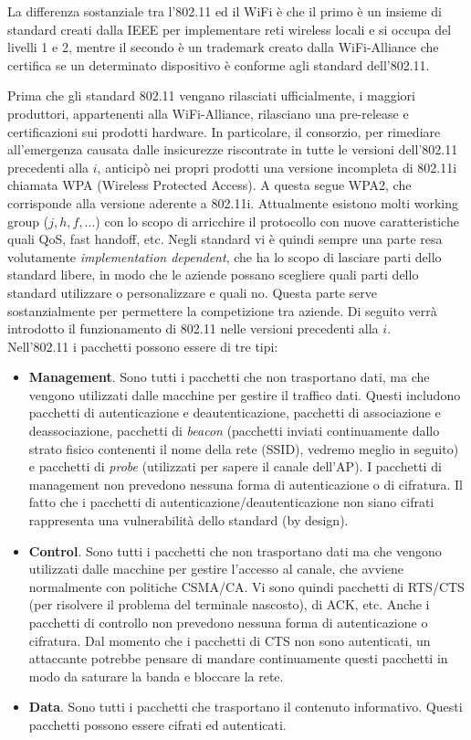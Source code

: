 La differenza sostanziale tra l'802.11 ed il WiFi è che il primo è un insieme di standard creati dalla IEEE per implementare reti wireless locali e si occupa del livelli 1 e 2, mentre il secondo è un trademark creato dalla WiFi-Alliance che certifica se un determinato dispositivo è conforme agli standard dell'802.11.

Prima che gli standard 802.11 vengano rilasciati ufficialmente, i maggiori produttori, appartenenti  alla WiFi-Alliance, rilasciano una pre-release e certificazioni sui prodotti hardware. In particolare, il consorzio, per rimediare all'emergenza causata dalle insicurezze riscontrate in tutte le versioni dell'802.11 precedenti alla $i$, anticipò nei propri prodotti una versione incompleta di 802.11i chiamata WPA (Wireless Protected Access). A questa segue WPA2, che corrisponde alla versione aderente a 802.11i. Attualmente esistono molti working group ($j,h,f,\dots$) con lo scopo di arricchire il protocollo con nuove caratteristiche quali QoS, fast handoff, etc. Negli standard vi è quindi sempre una parte resa volutamente \textit{implementation dependent}, che ha lo scopo di lasciare parti dello standard libere, in modo che le aziende possano scegliere quali parti dello standard utilizzare o personalizzare e quali no. Questa parte serve sostanzialmente per permettere la competizione tra aziende. Di seguito verrà introdotto il funzionamento di 802.11 nelle versioni precedenti alla $i$.\\

Nell'802.11 i pacchetti possono essere di tre tipi:
\begin{itemize}
	\item \textbf{Management}. Sono tutti i pacchetti che non trasportano dati, ma che vengono utilizzati dalle macchine per gestire il traffico dati. Questi includono pacchetti di autenticazione e deautenticazione, pacchetti di associazione e deassociazione, pacchetti di \textit{beacon} (pacchetti inviati continuamente dallo strato fisico contenenti il nome della rete (SSID), vedremo meglio in seguito) e pacchetti di \textit{probe} (utilizzati per sapere il canale dell'AP). I pacchetti di management non prevedono nessuna forma di autenticazione o di cifratura. Il fatto che i pacchetti di autenticazione/deautenticazione non siano cifrati rappresenta una vulnerabilità dello standard (by design).
	\item \textbf{Control}. Sono tutti i pacchetti che non trasportano dati ma che vengono utilizzati dalle macchine per gestire l'accesso al canale, che avviene normalmente con politiche CSMA/CA. Vi sono quindi pacchetti di RTS/CTS (per risolvere il problema del terminale nascosto), di ACK, etc. Anche i pacchetti di controllo non prevedono nessuna forma di autenticazione o cifratura. Dal momento che i pacchetti di CTS non sono autenticati, un attaccante potrebbe pensare di mandare continuamente questi pacchetti in modo da saturare la banda e bloccare la rete.
	\item \textbf{Data}. Sono tutti i pacchetti che trasportano il contenuto informativo. Questi pacchetti possono essere cifrati ed autenticati.
\end{itemize}

